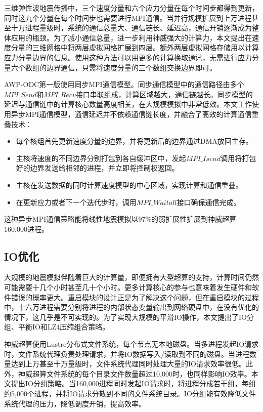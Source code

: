 \documentclass[degree=doctor]{thuthesis}
\begin{document}
三维弹性波地震传播中，三个速度分量和六个应力分量在每个时间步都得到更新，同时这九个分量在每个时间步也需要进行MPI通信。当并行规模扩展到上万进程甚至十万进程量级时，系统的通信总量大、通信链长、延迟高，通信开销逐渐成为整体应用的瓶颈。为了减小通信总量，进一步利用神威强大的计算力，本文提出在速度分量的三维网格中将两层虚拟网格扩展到四层。额外两层虚拟网格存储用以计算应力分量边界的信息。使用这种方法可以用更多的计算换取通讯，无需进行应力分量六个数组的边界通信，只需将速度分量的三个数组交换边界即可。

AWP-ODC第一版使用同步MPI通信模型。同步通信模型中的通信路径由多个$MPI\_Send$和$MPI\_Recv$接口串联组成，计算区域越大，通信链越长。同步模型的延迟与通信链中的计算核心数量高度相关，在大规模模拟中非常低效。本文工作使用异步MPI通信模型，通信延迟并不依赖通信链长度，并融合了高效的计算通信重叠技术：
\begin{itemize}
  \item 每个核组首先更新速度分量的边界，并将更新后的边界通过DMA放回主存。
  \item 主核将速度的不同边界分别打包到各自缓冲区中，发起$MPI\_Isend$调用将打包好的边界发送给相邻的进程，并立即将控制权返回。
  \item 主核在发送数据的同时计算速度模型的中心区域，实现计算和通信重叠。
  \item 在更新应力或者下一个迭代步时，调用$MPI\_Waitall$接口确保通信完成。
\end{itemize}
这种异步MPI通信策略能将线性地震模拟以97\%的弱扩展性扩展到神威超算160,000进程。

\subsection{IO优化}
\label{sub:IO优化}
大规模的地震模拟伴随着巨大的计算量，即便拥有大型超算的支持，计算时间仍然可能需要十几个小时甚至几十个小时。更多计算核心的参与也意味着发生硬件和软件错误的概率更大。重启模块的设计正是为了解决这个问题，但在重启模块的过程中，十六万进程需要分别将进程的内部状态变量输出到网络硬盘中，在没有优化的情况下，这几乎是不可实现的。为了实现大规模的平滑IO操作，本文提出了IO分组、平衡IO和LZ4压缩组合策略。

神威超算使用Lustre分布式文件系统，每个节点无本地磁盘。当多进程发起IO请求时，文件系统代理负责处理请求，并将IO数据写入/读取到不同的磁盘。当进程数量达到上万甚至十万量级时，文件系统代理同时处理大量的IO请求效率很低。此外，神威超算文件系统的每个目录文件数量超过10,000时，也同样影响IO效率。本文提出IO分组策略。当160,000进程同时发起IO请求时，将进程分成若干组，每组约5,000个进程，并将IO请求分散到不同的文件系统目录。IO分组能有效降低文件系统代理的压力，降低调度开销，提高效率。
\end{document}
